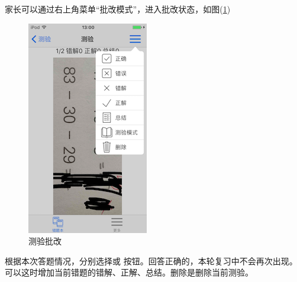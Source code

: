 家长可以通过右上角菜单“批改模式”，进入批改状态，如图(\ref{img36})
\begin{figure}[H]
	\centering
	\includegraphics{img/36.png}
	\caption{测验批改}
	\label{img36}
\end{figure}
根据本次答题情况，分别选择\Checkmark 或 \XSolid 按钮。回答正确的，本轮复习中不会再次出现。可以这时增加当前错题的错解、正解、总结。删除是删除当前测验。


